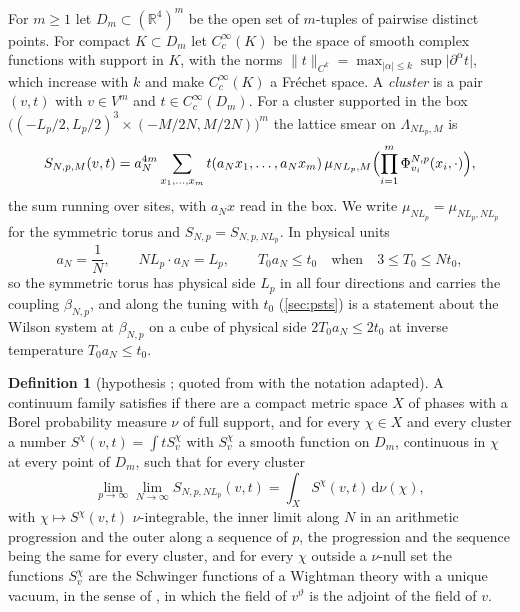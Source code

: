 \documentclass[11pt,a4paper]{amsart}
\theoremstyle{definition}
\newtheorem{definition}[theorem]{Definition}
\theoremstyle{remark}
\numberwithin{equation}{section}
\newcommand{\R}{\mathbb{R}}          %
\newcommand{\norm}[1]{\lVert #1\rVert}     %
\newcommand{\abs}[1]{\lvert #1\rvert}      %
\newcommand{\dd}{\,\mathrm{d}}             %
\newcommand{\Mcirc}{\text{\upshape(M$^{\circ}$)}}   %
\newcommand{\hypW}{\text{\upshape(W)}}              %
\newcommand{\aN}{a_N}                      %
\newcommand{\tzero}{t_0}                   %
\newcommand{\Tzero}{T_0}                   %
\newcommand{\Lp}{L_p}                      %
\newcommand{\betaNp}{\beta_{N,p}}          %
\begin{document}
For $m\ge1$ let $D_m\subset(\R^4)^m$ be the open set of $m$-tuples of pairwise distinct points. For compact $K\subset D_m$ let $C^\infty_c(K)$ be the space of smooth complex functions with support in $K$, with the norms $\norm{t}_{C^k}=\max_{\abs{\alpha}\le k}\sup\abs{\partial^\alpha t}$, which increase with $k$ and make $C^\infty_c(K)$ a Fr\'echet space. A \emph{cluster} is a pair $(v,t)$ with $v\in V^m$ and $t\in C^\infty_c(D_m)$. For a cluster supported in the box $\bigl((-\Lp/2,\Lp/2)^3\times(-M/2N,M/2N)\bigr)^m$ the lattice smear on $\Lambda_{N\Lp,M}$ is
\begin{equation}\label{eq:cont-smear}
S_{N,p,M}(v,t)=\aN^{4m}\sum_{x_1,\dots,x_m}t(\aN x_1,\dots,\aN x_m)\,\mu_{N\Lp,M}\Bigl(\prod_{i=1}^m\Phi^{N,p}_{v_i}(x_i,\cdot)\Bigr),
\end{equation}
the sum running over sites, with $\aN x$ read in the box. We write $\mu_{N\Lp}=\mu_{N\Lp,N\Lp}$ for the symmetric torus and $S_{N,p}=S_{N,p,N\Lp}$. In physical units
\begin{equation}\label{eq:physical-units}
\aN=\frac1N,\qquad N\Lp\cdot\aN=\Lp,\qquad \Tzero\aN\le\tzero\quad\text{when}\quad3\le\Tzero\le N\tzero ,
\end{equation}
so the symmetric torus has physical side $\Lp$ in all four directions and carries the coupling $\betaNp$, and \Mcirc{} along the tuning with $\tzero$ (\cref{sec:psts}) is a statement about the Wilson system at $\betaNp$ on a cube of physical side $2\Tzero\aN\le2\tzero$ at inverse temperature $\Tzero\aN\le\tzero$.

\begin{definition}[{hypothesis \hypW; quoted from \cite[Definition~4]{bhattacharjee2026first} with the notation adapted}]\label{def:W}
A continuum family satisfies \hypW{} if there are a compact metric space $X$ of phases with a Borel probability measure $\nu$ of full support, and for every $\chi\in X$ and every cluster a number $S^\chi(v,t)=\int tS^\chi_v$ with $S^\chi_v$ a smooth function on $D_m$, continuous in $\chi$ at every point of $D_m$, such that for every cluster
\[
\lim_{p\to\infty}\lim_{N\to\infty}S_{N,p,N\Lp}(v,t)=\int_XS^\chi(v,t)\dd\nu(\chi),
\]
with $\chi\mapsto S^\chi(v,t)$ $\nu$-integrable, the inner limit along $N$ in an arithmetic progression and the outer along a sequence of $p$, the progression and the sequence being the same for every cluster, and for every $\chi$ outside a $\nu$-null set the functions $S^\chi_v$ are the Schwinger functions of a Wightman theory with a unique vacuum, in the sense of \cite[Section~7.5 and Lemma~13]{bhattacharjee2026first}, in which the field of $v^\vartheta$ is the adjoint of the field of $v$.
\end{definition}
\end{document}
